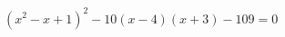 \begin{ex}[type=equation]
	\begin{condition}
		$\left(x^2 - x + 1\right)^2 - 10\left(x - 4\right)(x + 3) -109 = 0$
	\end{condition}
\end{ex}